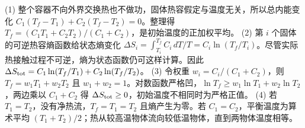 (1) 整个容器不向外界交换热也不做功，固体热容假定与温度无关，所以总内能变化 \(C_1(T_f-T_1)+C_2(T_f-T_2)=0\)。整理得 \(T_f=(C_1T_1+C_2T_2)/(C_1+C_2)\)，是初始温度的正加权平均。
(2) 第 \(i\) 个固体的可逆热容熵函数给状态熵变化 \(\Delta S_i=\int_{T_i}^{T_f}C_i\,dT/T=C_i\ln(T_f/T_i)\)。尽管实际热接触过程不可逆，熵为状态函数仍可这样计算。因此 \(\Delta S_{\rm tot}=C_1\ln(T_f/T_1)+C_2\ln(T_f/T_2)\)。
(3) 令权重 \(w_i=C_i/(C_1+C_2)\)，则 \(T_f=w_1T_1+w_2T_2\) 且 \(w_1+w_2=1\)。对数函数严格凹，\(\ln T_f\ge w_1\ln T_1+w_2\ln T_2\)，两边乘以 \(C_1+C_2\) 得 \(\Delta S_{\rm tot}\ge0\)，初始温度不相同时为严格正值。
(4) 若 \(T_1=T_2\)，没有净热流，\(T_f=T_1=T_2\) 且熵产生为零。若 \(C_1=C_2\)，平衡温度为算术平均 \((T_1+T_2)/2\)；热从较高温物体流向较低温物体，直到两物体温度相等。
